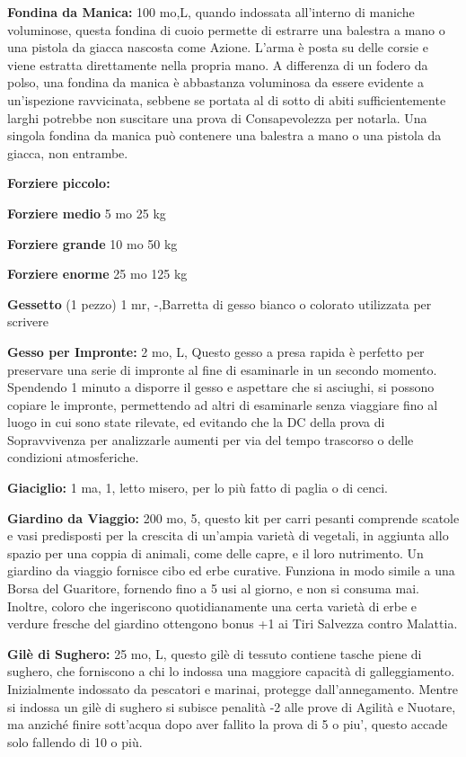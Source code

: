 \documentclass[a4paper,11pt,twoside,openany]{book}
\begin{document}
\textbf{Fondina da Manica:} 100 mo,L, quando indossata all'interno di maniche voluminose, questa fondina di cuoio permette di estrarre una balestra a mano o una pistola da giacca nascosta come Azione. L'arma è posta su delle corsie e viene estratta direttamente nella propria mano.
A differenza di un fodero da polso, una fondina da manica è abbastanza voluminosa da essere evidente a un'ispezione ravvicinata, sebbene se portata al di sotto di abiti sufficientemente larghi potrebbe non suscitare una prova di Consapevolezza per notarla. Una singola fondina da manica può contenere una balestra a mano o una pistola da giacca, non entrambe.

\textbf{Forziere piccolo:}

\textbf{Forziere medio} 5 mo 25 kg

\textbf{Forziere grande} 10 mo 50 kg

\textbf{Forziere enorme} 25 mo 125 kg

\textbf{Gessetto} (1 pezzo) 1 mr, -,Barretta di gesso bianco o colorato utilizzata per scrivere

\textbf{Gesso per Impronte:} 2 mo, L, Questo gesso a presa rapida è perfetto per preservare una serie di impronte al fine di esaminarle in un secondo momento. Spendendo 1 minuto a disporre il gesso e aspettare che si asciughi, si possono copiare le impronte, permettendo ad altri di esaminarle senza viaggiare fino al luogo in cui sono state rilevate, ed evitando che la DC della prova di Sopravvivenza per analizzarle aumenti per via del tempo trascorso o delle condizioni atmosferiche.

\textbf{Giaciglio:} 1 ma, 1, letto misero, per lo più fatto di paglia o di cenci.

\textbf{Giardino da Viaggio:} 200 mo, 5, questo kit per carri pesanti comprende scatole e vasi predispo­sti per la crescita di un'ampia varietà di vegetali, in aggiunta allo spazio per una coppia di animali, come delle capre, e il loro nutrimento. Un giardino da viaggio fornisce cibo ed erbe curative. Funziona in modo simile a una Borsa del Guaritore, fornendo fino a 5 usi al giorno, e non si consuma mai. Inoltre, coloro che ingeriscono quotidianamente una certa varietà di ­erbe e verdure fresche del giardino ottengono bonus +1 ai Tiri Salvezza contro Malattia.

\textbf{Gilè di Sughero:} 25 mo, L, questo gilè di tessuto contiene tasche piene di sughero, che forniscono a chi lo indossa una maggiore capacità di galleggiamento. Inizialmente indossato da pescatori e marinai, protegge dall'annegamento. Mentre si indossa un gilè di sughero si subisce penalità -2 alle prove di Agilità e Nuotare, ma anziché finire sott'acqua dopo aver fallito la prova di 5 o piu', questo accade solo fallendo di 10 o più.
\end{document}
